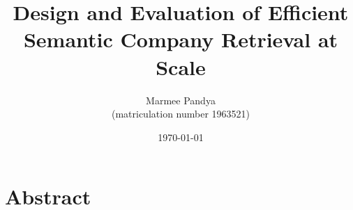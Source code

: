 \documentclass[a4paper,oneside,bibliography=totoc]{scrbook}
\begin{document}
\frontmatter \subject{Master Thesis} %
\title{Design and Evaluation of Efficient Semantic Company Retrieval at Scale}
\author{Marmee Pandya\\
(matriculation number 1963521)} \date{\today}
\publishers{{\small Submitted to}\\
Data and Web Science Group\\


Dr.\ Ralph Peeters\\ University of Mannheim\\}
\maketitle

\chapter{Abstract}
\end{document}
